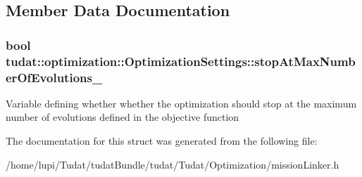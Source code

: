 \subsection{Member Data Documentation}
\subsubsection[{\texorpdfstring{stop\+At\+Max\+Number\+Of\+Evolutions\+\_\+}{stopAtMaxNumberOfEvolutions_}}]{\setlength{\rightskip}{0pt plus 5cm}bool tudat\+::optimization\+::\+Optimization\+Settings\+::stop\+At\+Max\+Number\+Of\+Evolutions\+\_\+}\hypertarget{structtudat_1_1optimization_1_1OptimizationSettings_a84e30eafb2caf9bfbb1a910ece971b5a}{}\label{structtudat_1_1optimization_1_1OptimizationSettings_a84e30eafb2caf9bfbb1a910ece971b5a}
Variable defining whether whether the optimization should stop at the maximum number of evolutions defined in the objective function 

The documentation for this struct was generated from the following file\+:\begin{DoxyCompactItemize}
\item 
/home/lupi/\+Tudat/tudat\+Bundle/tudat/\+Tudat/\+Optimization/mission\+Linker.\+h\end{DoxyCompactItemize}

